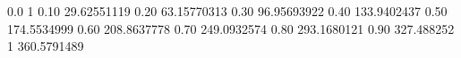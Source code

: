 0.0 1
0.10 29.62551119
0.20 63.15770313
0.30 96.95693922
0.40 133.9402437
0.50 174.5534999
0.60 208.8637778
0.70 249.0932574
0.80 293.1680121
0.90 327.488252
1 360.5791489
